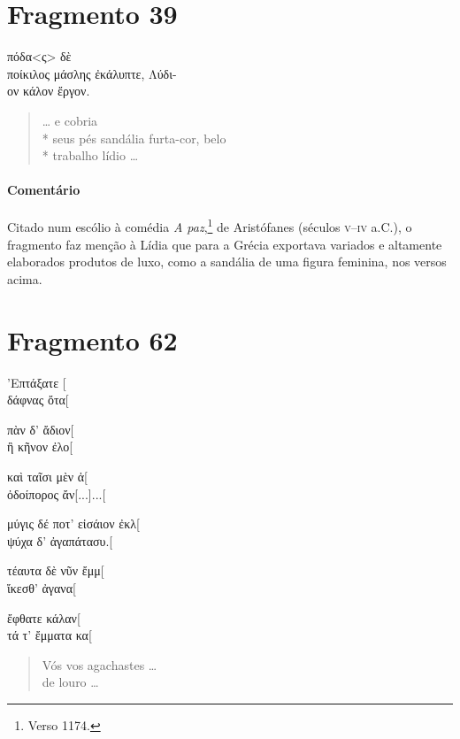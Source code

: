 {\section{Fragmento 39}

\begin{gkverse}
πόδα<ς> δὲ\\
ποίκιλος μάσλης ἐκάλυπτε, Λύδι-\\
ον κάλον ἔργον.
\end{gkverse}

\begin{verse}
\ldots{} e cobria\\*
seus pés sandália furta-cor, belo\\*
trabalho lídio \ldots{}
\end{verse}

\medskip

{\paragraph{Comentário} Citado num escólio à comédia \textit{A paz},\footnote{Verso 1174.} 
de Aristófanes (séculos \textsc{v}--\textsc{iv} a.C.),
o fragmento faz menção à Lídia que para a Grécia exportava variados e altamente
elaborados produtos de luxo, como a sandália de uma figura feminina, nos versos acima.}


\pagebreak
\section{Fragmento 62}

\begin{gkverse}
’Επτάξατε [\\
δάφνας ὄτα[

πὰν δ’ ἄδιον[\\
ἢ κῆνον ἐλο[

καὶ ταῖσι μὲν ἀ[\\
ὀδοίπορος ἄν[...]...[

μύγις δέ ποτ’ εἰσάιον ἐκλ[\\
ψύχα δ’ ἀγαπάτασυ.[

τέαυτα δὲ νῦν ἔμμ[\\
ἴκεσθ’ ἀγανα[

ἔφθατε κάλαν[\\
τά τ’ ἔμματα κα[
\end{gkverse}

\begin{verse}
Vós vos agachastes \ldots{}\\
de louro \ldots{}


\end{verse}}
